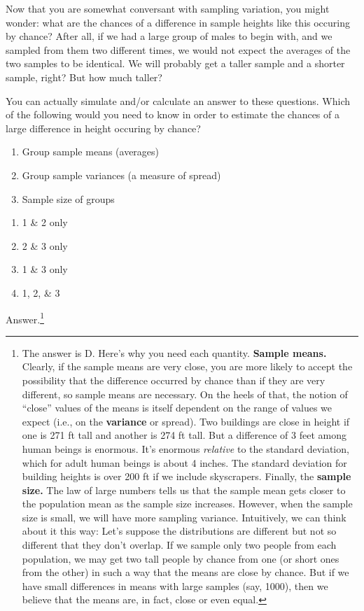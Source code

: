 \documentclass[openany]{book}
\providecommand{\tightlist}{%
  \setlength{\itemsep}{0pt}\setlength{\parskip}{0pt}}
\begin{document}
Now that you are somewhat conversant with sampling variation, you might wonder: what are the chances of a difference in sample heights like this occuring by chance? After all, if we had a large group of males to begin with, and we sampled from them two different times, we would not expect the averages of the two samples to be identical. We will probably get a taller sample and a shorter sample, right? But how much taller?

You can actually simulate and/or calculate an answer to these questions. Which of the following would you need to know in order to estimate the chances of a large difference in height occuring by chance?

\begin{enumerate}
\def\labelenumi{\arabic{enumi}.}
\tightlist
\item
  Group sample means (averages)
\item
  Group sample variances (a measure of spread)
\item
  Sample size of groups
\end{enumerate}

\begin{enumerate}
\def\labelenumi{\Alph{enumi})}
\tightlist
\item
  1 \& 2 only
\item
  2 \& 3 only
\item
  1 \& 3 only
\item
  1, 2, \& 3
\end{enumerate}

Answer.\footnote{The answer is D. Here's why you need each quantity. \textbf{Sample means.} Clearly, if the sample means are very close, you are more likely to accept the possibility that the difference occurred by chance than if they are very different, so sample means are necessary. On the heels of that, the notion of ``close'' values of the means is itself dependent on the range of values we expect (i.e., on the \textbf{variance} or spread). Two buildings are close in height if one is 271 ft tall and another is 274 ft tall. But a difference of 3 feet among human beings is enormous. It's enormous \emph{relative} to the standard deviation, which for adult human beings is about 4 inches. The standard deviation for building heights is over 200 ft if we include skyscrapers. Finally, the \textbf{sample size.} The law of large numbers tells us that the sample mean gets closer to the population mean as the sample size increases. However, when the sample size is small, we will have more sampling variance. Intuitively, we can think about it this way: Let's suppose the distributions are different but not so different that they don't overlap. If we sample only two people from each population, we may get two tall people by chance from one (or short ones from the other) in such a way that the means are close by chance. But if we have small differences in means with large samples (say, 1000), then we believe that the means are, in fact, close or even equal.}
\end{document}
